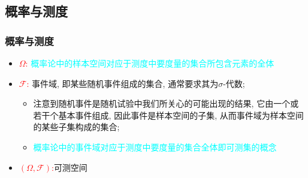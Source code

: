 \subsection{概率与测度}










\begin{frame}
	\frametitle{概率与测度}
	\begin{itemize}[<+-|alert@+>]
		\item \textcolor{red}{$\Omega$:}  \textcolor{cyan}{概率论中的样本空间对应于测度中要度量的集合所包含元素的全体}
		\item \textcolor{red}{$\mathcal{F}$:} 事件域, 即某些随机事件组成的集合, 通常要求其为$\sigma$-代数;
		\begin{itemize}
			\item 注意到随机事件是随机试验中我们所关心的可能出现的结果, 它由一个或若干个基本事件组成, 因此事件是样本空间的子集, 从而事件域为样本空间的某些子集构成的集合;
			\item \textcolor{cyan}{概率论中的事件域对应于测度中要度量的集合全体即可测集的概念}
		\end{itemize}
		\item \textcolor{red}{$(\Omega,\mathcal{F})$:}可测空间
	\end{itemize}

\end{frame}


